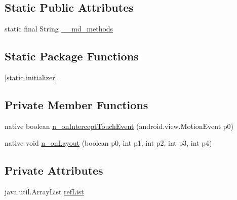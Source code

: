 \subsection*{Static Public Attributes}
\begin{CompactItemize}
\item 
static final String \hyperlink{classmd5b60ffeb829f638581ab2bb9b1a7f4f3f_1_1_master_detail_container_556c7fb30e166beeb9cd843dea89366f}{\_\-\_\-md\_\-methods}
\end{CompactItemize}
\subsection*{Static Package Functions}
\begin{CompactItemize}
\item 
\hyperlink{classmd5b60ffeb829f638581ab2bb9b1a7f4f3f_1_1_master_detail_container_6c8732252530fc8d94a73921abbc50f8}{\mbox{[}static initializer\mbox{]}}
\end{CompactItemize}
\subsection*{Private Member Functions}
\begin{CompactItemize}
\item 
native boolean \hyperlink{classmd5b60ffeb829f638581ab2bb9b1a7f4f3f_1_1_master_detail_container_843262038a60f2af2bbb4c867c0a0641}{n\_\-onInterceptTouchEvent} (android.view.MotionEvent p0)
\item 
native void \hyperlink{classmd5b60ffeb829f638581ab2bb9b1a7f4f3f_1_1_master_detail_container_a4ea06195f50a84c96f5163df0e39faa}{n\_\-onLayout} (boolean p0, int p1, int p2, int p3, int p4)
\end{CompactItemize}
\subsection*{Private Attributes}
\begin{CompactItemize}
\item 
java.util.ArrayList \hyperlink{classmd5b60ffeb829f638581ab2bb9b1a7f4f3f_1_1_master_detail_container_b2c4d24cca5bde061bd6ca0b037af523}{refList}
\end{CompactItemize}


